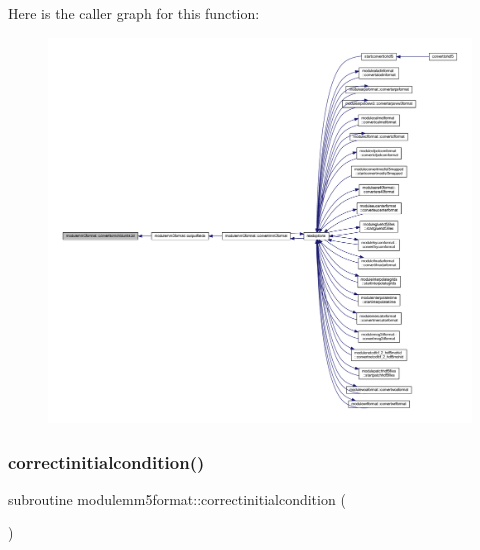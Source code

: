 Here is the caller graph for this function\+:\nopagebreak
\begin{figure}[H]
\begin{center}
\leavevmode
\includegraphics[width=350pt]{namespacemodulemm5format_a0afd52db4648ea76112e242c40b31323_icgraph}
\end{center}
\end{figure}
\mbox{\label{namespacemodulemm5format_aecf73e96a833b95d469c3682bf5df737}} 
\subsubsection{\texorpdfstring{correctinitialcondition()}{correctinitialcondition()}}
{\footnotesize\ttfamily subroutine modulemm5format\+::correctinitialcondition (\begin{DoxyParamCaption}{ }\end{DoxyParamCaption})\hspace{0.3cm}{\ttfamily [private]}}

